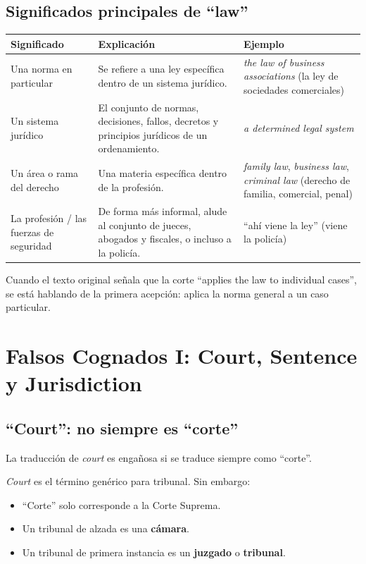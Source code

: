\documentclass[12pt,oneside]{book}
\begin{document}
\subsection*{Significados principales de ``law''}

\begin{table}[H]
\centering
\begin{tabularx}{\textwidth}{p{3.5cm} X p{4.5cm}}
\toprule
\textbf{Significado} & \textbf{Explicación} & \textbf{Ejemplo} \\
\midrule
Una norma en particular & Se refiere a una ley específica dentro de un sistema jurídico. & \textit{the law of business associations} (la ley de sociedades comerciales) \\
\midrule
Un sistema jurídico & El conjunto de normas, decisiones, fallos, decretos y principios jurídicos de un ordenamiento. & \textit{a determined legal system} \\
\midrule
Un área o rama del derecho & Una materia específica dentro de la profesión. & \textit{family law}, \textit{business law}, \textit{criminal law} (derecho de familia, comercial, penal) \\
\midrule
La profesión / las fuerzas de seguridad & De forma más informal, alude al conjunto de jueces, abogados y fiscales, o incluso a la policía. & ``ahí viene la ley'' (viene la policía) \\
\bottomrule
\end{tabularx}
\end{table}

Cuando el texto original señala que la corte ``applies the law to individual cases'', se está hablando de la primera acepción: aplica la norma general a un caso particular.

\section{Falsos Cognados I: Court, Sentence y Jurisdiction}

\subsection{``Court'': no siempre es ``corte''}

La traducción de \textit{court} es engañosa si se traduce siempre como ``corte''. 

\textit{Court} es el término genérico para tribunal. Sin embargo:

\begin{itemize}
    \item ``Corte'' solo corresponde a la Corte Suprema.
    \item Un tribunal de alzada es una \textbf{cámara}.
    \item Un tribunal de primera instancia es un \textbf{juzgado} o \textbf{tribunal}.
\end{itemize}
\end{document}
